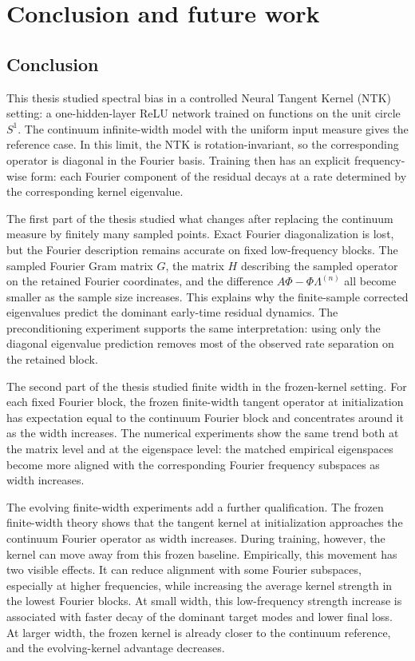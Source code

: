 \chapter{\label{cha:conclusion}Conclusion and future work}

\section{Conclusion}
\label{sec:conclusion}

This thesis studied spectral bias in a controlled Neural Tangent Kernel (NTK)
setting: a one-hidden-layer ReLU network trained on functions on the unit circle
\(S^1\). The continuum infinite-width model with the uniform input measure gives
the reference case. In this limit, the NTK is rotation-invariant, so the
corresponding operator is diagonal in the Fourier basis. Training then has an
explicit frequency-wise form: each Fourier component of the residual decays at
a rate determined by the corresponding kernel eigenvalue.

The first part of the thesis studied what changes after replacing the continuum
measure by finitely many sampled points. Exact Fourier diagonalization is lost,
but the Fourier description remains accurate on fixed low-frequency blocks. The
sampled Fourier Gram matrix \(G\), the matrix \(H\) describing the sampled
operator on the retained Fourier coordinates, and the difference
\(A\Phi-\Phi\Lambda^{(n)}\) all become smaller as the sample size increases.
This explains why the finite-sample corrected eigenvalues predict the dominant
early-time residual dynamics. The preconditioning experiment supports the same
interpretation: using only the diagonal eigenvalue prediction removes most of
the observed rate separation on the retained block.

The second part of the thesis studied finite width in the frozen-kernel setting.
For each fixed Fourier block, the frozen finite-width tangent operator at
initialization has expectation equal to the continuum Fourier block and
concentrates around it as the width increases. The numerical experiments show
the same trend both at the matrix level and at the eigenspace level: the matched
empirical eigenspaces become more aligned with the corresponding Fourier
frequency subspaces as width increases.

The evolving finite-width experiments add a further qualification. The frozen
finite-width theory shows that the tangent kernel at initialization approaches
the continuum Fourier operator as width increases. During training, however, the
kernel can move away from this frozen baseline. Empirically, this movement has
two visible effects. It can reduce alignment with some Fourier subspaces,
especially at higher frequencies, while increasing the average kernel strength
in the lowest Fourier blocks. At small width, this low-frequency strength
increase is associated with faster decay of the dominant target modes and lower
final loss. At larger width, the frozen kernel is already closer to the
continuum reference, and the evolving-kernel advantage decreases.

